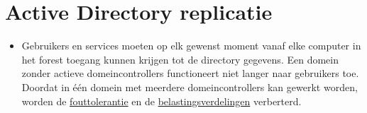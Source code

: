 	\section{Active Directory replicatie }
	\begin{enumerate}
		 {
			\begin{itemize}
				\item Gebruikers en services moeten op elk gewenst moment vanaf elke computer in het forest toegang kunnen krijgen tot de directory gegevens. Een domein zonder actieve domeincontrollers functioneert niet langer naar gebruikers toe. Doordat in één domein met meerdere domeincontrollers kan gewerkt worden, worden de \underline{fouttolerantie} en de \underline{belastingsverdelingen} verberterd.
			\end{itemize}
		}
		

\end{enumerate}
